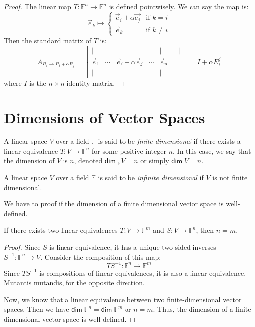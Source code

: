\documentclass[
	11pt, %
	fleqn, %
	a4paper, %
]{LegrandOrangeBook}
\newcommand{\F}{\mathbb{F}} %
\renewcommand{\dim}{\mathsf{dim\;}} %
\begin{document}
\begin{proof}
    The linear map $T: \F^n \to \F^n$ is defined pointwisely. We can say the map is:
    \[
        \vec{e}_k \mapsto \begin{cases}
            \vec{e}_i + \alpha \vec{e_j} & \text{if } k = i \\
            \vec{e}_k & \text{if } k \neq i
        \end{cases}
    \]
    Then the standard matrix of $T$ is:
    \[
        A_{R_i \to R_i + \alpha R_j} = \begin{bmatrix}
            | & & | & & | & & | \\
            \vec{e}_1 & \cdots & \vec{e}_i + \alpha\vec{e}_j & \cdots & \vec{e}_n \\
            | & & | & & |
        \end{bmatrix} = I + \alpha E_i^j
    \]
    where $I$ is the $n \times n$ identity matrix.
\end{proof}

\newpage

\section{Dimensions of Vector Spaces}

\begin{definition} \label{def:finite_dimensional_vector_space}
    A linear space $V$ over a field $\F$ is said to be \emph{finite dimensional} if there exists a linear equivalence $T: V \to \F^n$ for some positive integer $n$. In this case, we say that the dimension of $V$ is $n$, denoted $\dim_{\F} V = n$ or simply $\dim V = n$.
\end{definition}

\begin{definition}
    A linear space $V$ over a field $\F$ is said to be \emph{infinite dimensional} if $V$ is not finite dimensional.
\end{definition}

We have to proof if the dimension of a finite dimensional vector space is well-defined.

\begin{proposition}
    If there exists two linear equivalences $T: V \to \F^m$ and $S: V \to \F^n$, then $n = m$.
\end{proposition}

\begin{proof}
    Since $S$ is linear equivalence, it has a unique two-sided inverses $S^{-1}: \F^n \to V$. Consider the composition of this map:
    \[
        TS^{-1}: \F^n \to \F^m
    \]
    Since $TS^{-1}$ is compositions of linear equivalences, it is also a linear equivalence. Mutantis mutandis, for the opposite direction.

    Now, we know that a linear equivalence between two finite-dimensional vector spaces. Then we have $\dim \F^n = \dim \F^m$ or $n = m$. Thus, the dimension of a finite dimensional vector space is well-defined.
\end{proof}
\end{document}
